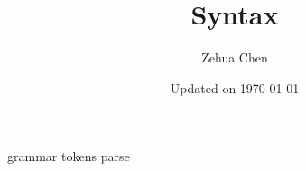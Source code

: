 \documentclass{report}
\title{Syntax}
\author{Zehua Chen}
\date{Updated on \today}
\begin{document}
  \maketitle
  \tableofcontents

  {grammar}
  {tokens}
  {parse}
\end{document}
